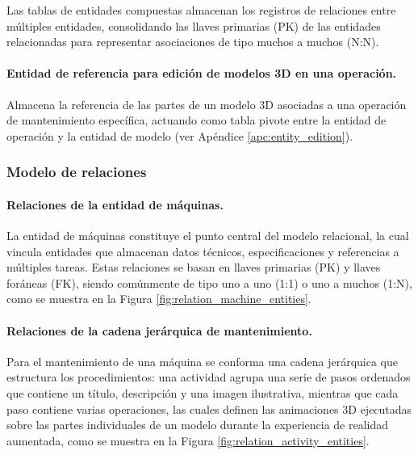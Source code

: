             Las tablas de entidades compuestas almacenan los registros de relaciones entre múltiples entidades, consolidando las llaves primarias (PK) de las entidades relacionadas para representar asociaciones de tipo muchos a muchos (N:N).

            \paragraph{Entidad de referencia para edición de modelos 3D en una operación.}
            
                Almacena la referencia de las partes de un modelo 3D asociadas a una operación de mantenimiento específica, actuando como tabla pivote entre la entidad de operación y la entidad de modelo (ver Apéndice \ref{apc:entity_edition}).

        \subsubsection{Modelo de relaciones}

            \paragraph{Relaciones de la entidad de máquinas.}
            
                La entidad de máquinas constituye el punto central del modelo relacional, la cual vincula entidades que almacenan datos técnicos, especificaciones y referencias a múltiples tareas. Estas relaciones se basan en llaves primarias (PK) y llaves foráneas (FK), siendo comúnmente de tipo uno a uno (1:1) o uno a muchos (1:N), como se muestra en la Figura \ref{fig:relation_machine_entities}.

                

            \paragraph{Relaciones de la cadena jerárquica de mantenimiento.}
            

                Para el mantenimiento de una máquina se conforma una cadena jerárquica que estructura los procedimientos: una actividad agrupa una serie de pasos ordenados que contiene un título, descripción y una imagen ilustrativa, mientras que cada paso contiene varias operaciones, las cuales definen las animaciones 3D ejecutadas sobre las partes individuales de un modelo durante la experiencia de realidad aumentada, como se muestra en la Figura \ref{fig:relation_activity_entities}.

